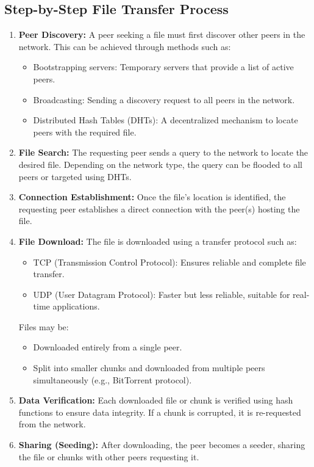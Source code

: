 \documentclass[12pt,a4paper]{article}
\begin{document}
\subsection{Step-by-Step File Transfer Process}
\begin{enumerate}
    \item \textbf{Peer Discovery:}
    A peer seeking a file must first discover other peers in the network. This can be achieved through methods such as:
    \begin{itemize}
        \item Bootstrapping servers: Temporary servers that provide a list of active peers.
        \item Broadcasting: Sending a discovery request to all peers in the network.
        \item Distributed Hash Tables (DHTs): A decentralized mechanism to locate peers with the required file.
    \end{itemize}

    \item \textbf{File Search:}
    The requesting peer sends a query to the network to locate the desired file. Depending on the network type, the query can be flooded to all peers or targeted using DHTs.

    \item \textbf{Connection Establishment:}
    Once the file’s location is identified, the requesting peer establishes a direct connection with the peer(s) hosting the file.

    \item \textbf{File Download:}
    The file is downloaded using a transfer protocol such as:
    \begin{itemize}
        \item TCP (Transmission Control Protocol): Ensures reliable and complete file transfer.
        \item UDP (User Datagram Protocol): Faster but less reliable, suitable for real-time applications.
    \end{itemize}
    Files may be:
    \begin{itemize}
        \item Downloaded entirely from a single peer.
        \item Split into smaller chunks and downloaded from multiple peers simultaneously (e.g., BitTorrent protocol).
    \end{itemize}

    \item \textbf{Data Verification:}
    Each downloaded file or chunk is verified using hash functions to ensure data integrity. If a chunk is corrupted, it is re-requested from the network.

    \item \textbf{Sharing (Seeding):}
    After downloading, the peer becomes a seeder, sharing the file or chunks with other peers requesting it.
\end{enumerate}
\end{document}
